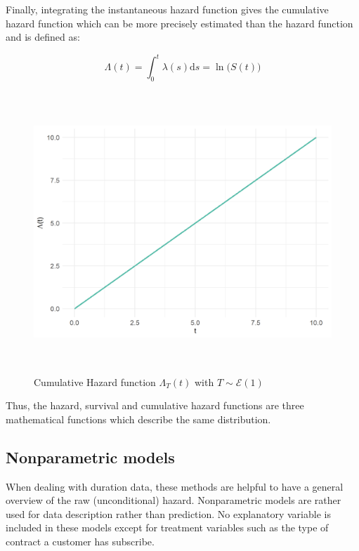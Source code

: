 \documentclass[
]{book}
\begin{document}
Finally, integrating the instantaneous hazard function gives the cumulative hazard function which can be more precisely estimated than the hazard function \citep{CAMERON_TRIVEDI} and is defined as:

\begin{equation}
  \Lambda (t) = \int_{0}^{t} \lambda(s) \text{d}s = \ln \big(S(t)\big)
  \label{eq:cumhazfun}
\end{equation}

\begin{figure}

{\centering \includegraphics[width=400pt,height=300pt]{./imgs/cum_haz_plot} 

}

\caption{Cumulative Hazard function $\Lambda_T(t)$ with $T \sim \mathcal{E} (1)$}\label{fig:cumhazplot}
\end{figure}

Thus, the hazard, survival and cumulative hazard functions are three mathematical functions which describe the same distribution.

\hypertarget{nonparametric-models}{%
\subsection{Nonparametric models}\label{nonparametric-models}}

When dealing with duration data, these methods are helpful to have a general overview of the raw (unconditional) hazard. Nonparametric models are rather used for data description rather than prediction. No explanatory variable is included in these models except for treatment variables such as the type of contract a customer has subscribe.
\end{document}
